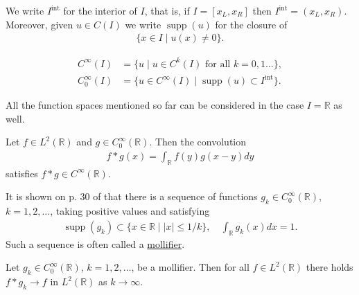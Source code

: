 \documentclass[12pt,oneside,final]{amsart}
\def\R{\mathbb R}
\DeclareMathOperator{\supp}{supp}
\def\inter{\mathrm{int}}
\begin{document}
We write $I^\inter$ for the interior of $I$, that is, 
if $I = [x_L, x_R]$ then $I^\inter = (x_L, x_R)$. 
Moreover, given $u \in C(I)$ we write $\supp(u)$ for the closure of 
    \begin{align*}
\{x \in I \mid u(x) \ne 0\}.
    \end{align*}

\begin{definition}
    \begin{align*}
C^\infty(I) &= 
\{ u \mid 
\text{$u \in C^k(I)$ for all $k=0,1\dots$} \},
\\
C_0^\infty(I) &= 
\{ u \in C^\infty(I) \mid 
\text{$\supp(u) \subset I^\inter$}\}.
    \end{align*}
\end{definition}

All the function spaces mentioned so far can be considered in the case $I = \R$ as well.

\begin{theorem}\label{th_smoothing}
Let $f \in L^2(\R)$ and $g \in C_0^\infty(\R)$. Then the convolution
    \begin{align*}
f * g(x) = \int_\R f(y) g(x - y) dy
    \end{align*}
satisfies $f * g \in C^\infty(\R)$.
\end{theorem}

It is shown on p. 30 of \cite{Holopainen} that 
there is a sequence of functions $g_k \in C_0^\infty(\R)$, $k=1,2,\dots$, taking positive values and satisfying 
    \begin{align}\label{def_mollifier}
\supp(g_k) \subset \{x \in \R \mid |x| \le 1/k\},
\quad
\int_\R g_k(x) dx = 1.
    \end{align}
Such a sequence is often called a \href{https://en.wikipedia.org/wiki/Mollifier}{mollifier}.

\begin{theorem}\label{th_mollification}
Let $g_k \in C_0^\infty(\R)$, $k=1,2,\dots$,
be a mollifier. Then for all $f \in L^2(\R)$ there holds $f * g_k \to f$ in $L^2(\R)$ as $k \to \infty$. 
\end{theorem}
\end{document}
